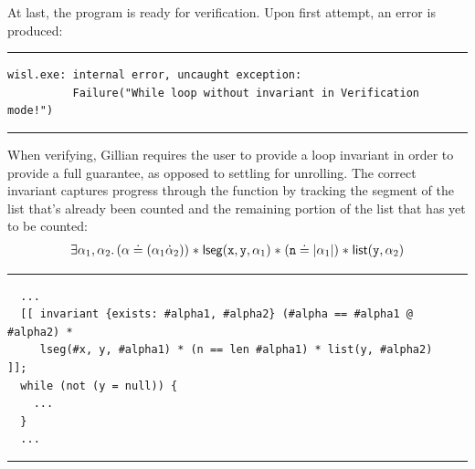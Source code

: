 At last, the program is ready for verification. Upon first attempt, an error is
produced:
\noindent\rule{\textwidth}{0.5pt}
\vspace{-0.6cm}
\begin{verbatim}
wisl.exe: internal error, uncaught exception:
          Failure("While loop without invariant in Verification mode!")
\end{verbatim}
\vspace{-0.4cm}
\noindent\rule{\textwidth}{0.5pt}
\vspace{-0.6cm}
\vspace{0.5cm}

When verifying, Gillian requires the user to provide a loop invariant in order
to provide a full guarantee, as opposed to settling for unrolling. The correct
invariant captures progress through the function by tracking the segment of the
list that's already been counted and the remaining portion of the list that has
yet to be counted:
\begin{align*}
    \exists \alpha_1, \alpha_2 \ldotp (\alpha \doteq (\alpha_1 \dot \alpha_2)) \mathrel{*} \mathsf{lseg}(\mathtt{x}, \mathtt{y}, \alpha_1) \mathrel{*} (\mathtt{n} \doteq | \alpha_1 |) \mathrel{*} \mathsf{list}(\mathtt{y}, \alpha_2)
\end{align*}

\noindent\rule{\textwidth}{0.5pt}
\vspace{-0.6cm}
\begin{verbatim}
  ...
  [[ invariant {exists: #alpha1, #alpha2} (#alpha == #alpha1 @ #alpha2) * 
     lseg(#x, y, #alpha1) * (n == len #alpha1) * list(y, #alpha2)         ]];
  while (not (y = null)) {
    ...
  }
  ...
\end{verbatim}
\vspace{-0.4cm}
\noindent\rule{\textwidth}{0.5pt}
\vspace{-0.6cm}
\vspace{0.5cm}


